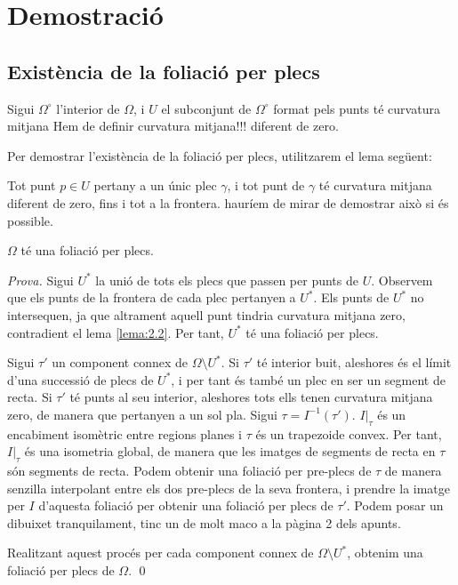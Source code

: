 \section{Demostració}
\subsection{Existència de la foliació per plecs}
Sigui $\Omega^\circ$ l'interior de $\Omega$, i $U$ el subconjunt de $\Omega^\circ$ format pels punts té curvatura mitjana {\color{blue} Hem de definir curvatura mitjana!!!} diferent de zero.

Per demostrar l'existència de la foliació per plecs, utilitzarem el lema següent:
\begin{lema}\label{lema:2.2}
    Tot punt $p\in U$ pertany a un únic plec $\gamma$, i tot punt de $\gamma$ té curvatura mitjana diferent de zero, fins i tot a la frontera. {\color{blue} hauríem de mirar de demostrar això si és possible.}
\end{lema}

\begin{teo}\label{teo:existencia_foliacio_plecs}
    $\Omega$ té una foliació per plecs.
\end{teo}
{
    \color{green!50!black}
    \textit{Prova.}
    Sigui $U^*$ la unió de tots els plecs que passen per punts de $U$. Observem que els punts de la frontera de cada plec pertanyen a $U^*$. Els punts de $U^*$ no intersequen, ja que altrament aquell punt tindria curvatura mitjana zero, contradient el lema \ref{lema:2.2}. Per tant, $U^*$ té una foliació per plecs. 

    Sigui $\tau'$ un component connex de $\Omega\setminus U^*$.
    Si $\tau'$ té interior buit, aleshores és el límit d'una successió de plecs de $U^*$, i per tant és també un plec en ser un segment de recta.
    Si $\tau'$ té punts al seu interior, aleshores tots ells tenen curvatura mitjana zero, de manera que pertanyen a un sol pla.
    Sigui $\tau = I^{-1}(\tau')$. $I|_{\tau}$ és un encabiment isomètric entre regions planes i $\tau$ és un trapezoide convex. Per tant, $I|_{\tau}$ és una isometria global, de manera que les imatges de segments de recta en $\tau$ són segments de recta. Podem obtenir una foliació per pre-plecs de $\tau$ de manera senzilla interpolant entre els dos pre-plecs de la seva frontera, i prendre la imatge per $I$ d'aquesta foliació per obtenir una foliació per plecs de $\tau'$.{\color{blue} Podem posar un dibuixet tranquilament, tinc un de molt maco a la pàgina 2 dels apunts.}

    Realitzant aquest procés per cada component connex de $\Omega\setminus U^*$, obtenim una foliació per plecs de $\Omega$.
    \qed
}
